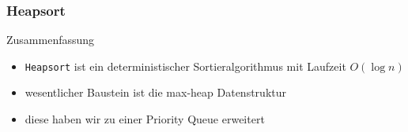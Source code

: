 \documentclass[aspectratio=1610, 11pt]{beamer}
\begin{document}
\begin{frame}\frametitle{Heapsort}
	\begin{exampleblock}{Zusammenfassung}
		\begin{itemize}
			\item {\tt Heapsort} ist ein deterministischer Sortieralgorithmus mit Laufzeit $O(\log n)$
			\item wesentlicher Baustein ist die max-heap Datenstruktur
			\item diese haben wir zu einer Priority Queue erweitert
		\end{itemize}
	\end{exampleblock}
\end{frame}
\end{document}
